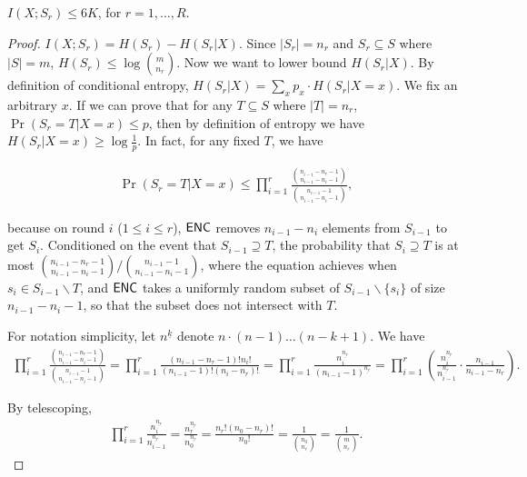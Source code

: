 \begin{lemma}\label{lemma:mutual-entropy-bound}
  $I(X;S_r)\le 6K$, for $r=1,\ldots, R$.
\end{lemma}

\begin{proof}
  $I(X;S_r)=H(S_r)-H(S_r|X)$. Since $|S_r|=n_r$ and $S_r\subseteq S$ where $|S|=m$, $H(S_r)\le \log {m \choose n_r}$. Now we want to lower bound $H(S_r|X)$. By definition of conditional entropy, $H(S_r|X)=\sum_x{p_x\cdot H(S_r|X=x)}$. We fix an arbitrary $x$. If we can prove that for any $T\subseteq S$ where $|T|=n_r$, $\Pr(S_r=T|X=x)\le p$, then by definition of entropy we have $H(S_r|X=x)\ge\log\frac{1}{p}$. In fact, for any fixed $T$, we have
  
  \begin{align}
    \Pr(S_r=T|X=x)\le \prod_{i=1}^{r}{\frac{{n_{i-1}-n_r-1 \choose n_{i-1}-n_i-1}}{{n_{i-1}-1 \choose n_{i-1}-n_i-1}}},
  \end{align}
  
  because on round $i$ ($1\le i \le r$), $\textsf{ENC}$ removes $n_{i-1}-n_i$ elements from $S_{i-1}$ to get $S_i$. Conditioned on the event that $S_{i-1}\supseteq T$, the probability that $S_i\supseteq T$ is at most ${{n_{i-1}-n_r-1 \choose n_{i-1}-n_i-1}}/{{n_{i-1}-1 \choose n_{i-1}-n_i-1}}$, where the equation achieves when $s_i\in S_{i-1}\backslash T$, and $\textsf{ENC}$ takes a uniformly random subset of $S_{i-1}\backslash \{s_i\}$ of size $n_{i-1}-n_i-1$, so that the subset does not intersect with $T$.
  
  For notation simplicity, let $n^{\underline{k}}$ denote $n\cdot (n-1)\ldots (n-k+1)$. We have 
  \begin{align}
    \prod_{i=1}^{r}{\frac{{n_{i-1}-n_r-1 \choose n_{i-1}-n_i-1}}{{n_{i-1}-1 \choose n_{i-1}-n_i-1}}}
    =\prod_{i=1}^{r}\frac{(n_{i-1}-n_r-1)!n_i!}{(n_{i-1}-1)!(n_i-n_r)!}
    =\prod_{i=1}^{r}\frac{n_i^{\underline{n_r}}}{(n_{i-1}-1)^{\underline{n_r}}}
    =\prod_{i=1}^{r} \left( \frac{n_i^{\underline{n_r}}}{n_{i-1}^{\underline{n_r}}}\cdot \frac{n_{i-1}}{n_{i-1}-n_r} \right).
  \end{align}
  
  By telescoping,
  \begin{align}
    \prod_{i=1}^{r} \frac{n_i^{\underline{n_r}}}{n_{i-1}^{\underline{n_r}}}
    =\frac{n_r^{\underline{n_r}}}{n_0^{\underline{n_r}}}
    =\frac{n_r!(n_0-n_r)!}{n_0!}=\frac{1}{{n_0 \choose n_r}}
    =\frac{1}{{m \choose n_r}}.
  \end{align}
  

\end{proof}
